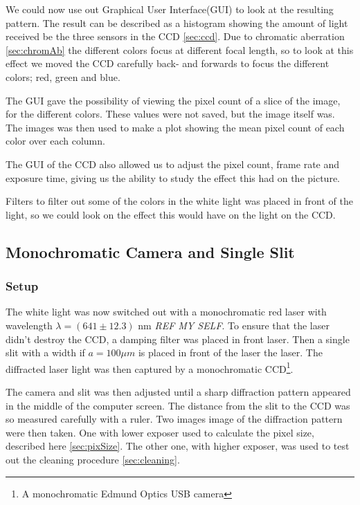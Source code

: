 \documentclass{emulateapj}
\begin{document}
We could now use out Graphical User Interface(GUI) to look at the resulting pattern. The result can be described as a histogram showing the amount of light received be the three sensors in the CCD \ref{sec:ccd}. Due to chromatic aberration \ref{sec:chromAb} the different colors focus at different focal length, so to look at this effect we moved the CCD carefully back- and forwards to focus the different colors; red, green and blue.

The GUI gave the possibility of viewing the pixel count of a slice of the image, for the different colors. These values were not saved, but the image itself was. The images was then used to make a plot showing the mean pixel count of each color over each column.

The GUI of the CCD also allowed us to adjust the pixel count, frame rate and exposure time, giving us the ability to study the effect this had on the picture.

Filters to filter out some of the colors in the white light was placed in front of the light, so we could look on the effect this would have on the light on the CCD. 


\subsection{Monochromatic Camera and Single Slit}

\subsubsection{Setup}

The white light was now switched out with a monochromatic red laser with wavelength $\lambda = (641 \pm 12.3)$ nm \emph{REF MY SELF}. To ensure that the laser didn't destroy the CCD, a damping filter was placed in front laser. Then a single slit with a width if $a = 100\mu m$ is placed in front of the laser the laser. The diffracted laser light was then captured by a monochromatic CCD\footnote{A monochromatic Edmund Optics USB camera}. 

The camera and slit was then adjusted until a sharp diffraction pattern appeared in the middle of the computer screen. The distance from the slit to the CCD was so measured carefully with a ruler. Two images image of the diffraction pattern were then taken. One with lower exposer used to calculate the pixel size, described here \ref{sec:pixSize}. The other one, with higher exposer, was used to test out the cleaning procedure \ref{sec:cleaning}.
\end{document}
